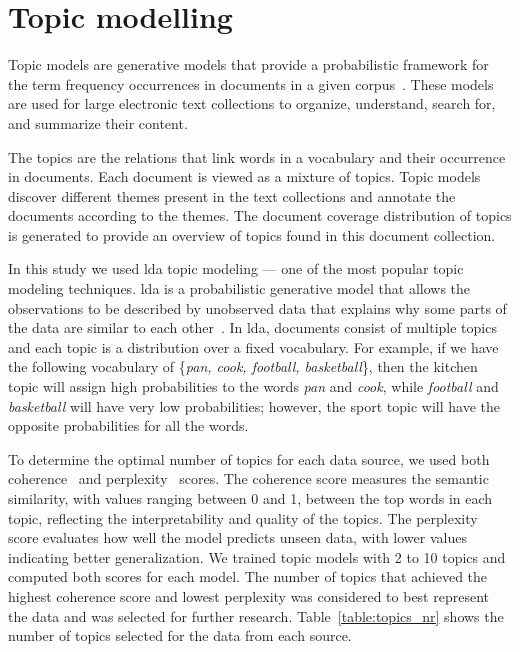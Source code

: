 \section{Topic modelling}\label{sec:topic-modelling-methodology}
Topic models are generative models that provide a probabilistic framework for the term frequency occurrences in documents in a given corpus~\cite{topic-model}. These models are used for large electronic text collections to organize, understand, search for, and summarize their content. 

The topics are the relations that link words in a vocabulary and their occurrence in documents. Each document is viewed as a mixture of topics. Topic models discover different themes present in the text collections and annotate the documents according to the themes. The document coverage distribution of topics is generated to provide an overview of topics found in this document collection. 

In this study we used \acrfull{lda} topic modeling --- one of the most popular topic modeling techniques. \Acrshort{lda} is a probabilistic generative model that allows the observations to be described by unobserved data that explains why some parts of the data are similar to each other~\cite{tong-topic-modelling}. In \acrshort{lda}, documents consist of multiple topics and each topic is a distribution over a fixed vocabulary. For example, if we have the following vocabulary of \{\textit{pan, cook, football, basketball}\}, then the kitchen topic will assign high probabilities to the words \textit{pan} and \textit{cook}, while \textit{football} and \textit{basketball} will have very low probabilities; however, the sport topic will have the opposite probabilities for all the words. 

To determine the optimal number of topics for each data source, we used both coherence~\cite{coherence} and perplexity~\cite{perplexity} scores. The coherence score measures the semantic similarity, with values ranging between 0 and 1, between the top words in each topic, reflecting the interpretability and quality of the topics. The perplexity score evaluates how well the model predicts unseen data, with lower values indicating better generalization. We trained topic models with 2 to 10 topics and computed both scores for each model. The number of topics that achieved the highest coherence score and lowest perplexity was considered to best represent the data and was selected for further research. Table~\ref{table:topics_nr} shows the number of topics selected for the data from each source.

